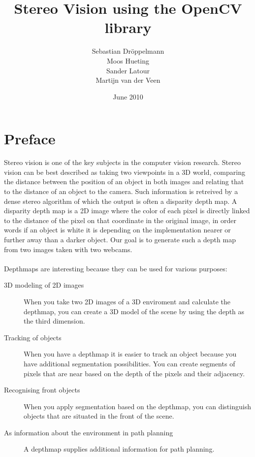 \documentclass{article}
\begin{document}
\title[Stereo vision]{Stereo Vision using the OpenCV library}
\author[Dr\"oppelmann \and Hueting \and Latour \and \\Van der Veen]{Sebastian Dr\"oppelmann \\ Moos Hueting \\ Sander Latour \\ Martijn van der Veen}
\date{June 2010}

  \titlepage

\section{Preface}
Stereo vision is one of the key subjects in the computer vision research. Stereo vision can be best described as taking two viewpoints in a 3D world, comparing the distance between the position of an object in both images and relating that to the distance of an object to the camera. Such information is retreived by a dense stereo algorithm of which the output is often a disparity depth map. A disparity depth map is a 2D image where the color of each pixel is directly linked to the distance of the pixel on that coordinate in the original image, in order words if an object is white it is depending on the implementation nearer or further away than a darker object. Our goal is to generate such a depth map from two images taken with two webcams.\\\\

Depthmaps are interesting because they can be used for various purposes: 
\begin{description}
 \item[3D modeling of 2D images] When you take two 2D images of a 3D enviroment and calculate the depthmap, you can create a 3D model of the scene by using the depth as the third dimension.
 \item[Tracking of objects] When you have a depthmap it is easier to track an object because you have additional segmentation possibilities. You can create segments of pixels that are near based on the depth of the pixels and their adjacency.
 \item[Recognising front objects] When you apply segmentation based on the depthmap, you can distinguish objects that are situated in the front of the scene.
 \item[As information about the environment in path planning] A depthmap supplies additional information for path planning.
\end{description}
\end{document}
